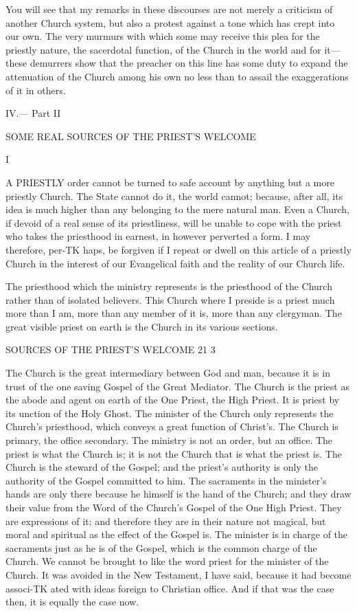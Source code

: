 \documentclass[12pt,a5paper,oneside]{book}
\begin{document}
{{You will see that my remarks in these discourses 
are not merely a criticism of another Church system, 
but also a protest against a tone which has crept into 
our own. The very murmurs with which some may 
receive this plea for the priestly nature, the sacerdotal 
function, of the Church in the world and for it---these 
demurrers show that the preacher on this line has 
some duty to expand the attenuation of the Church 
among his own no less than to assail the exaggerations 
of it in others. 



IV.— Part II 

SOME REAL SOURCES OF THE PRIEST'S 
WELCOME 

I 

A PRIESTLY order cannot be turned to safe account 
by anything but a more priestly Church. The State 
cannot do it, the world cannot; because, after all, 
its idea is much higher than any belonging to the 
mere natural man. Even a Church, if devoid of a 
real sense of its priestliness, will be unable to cope 
with the priest who takes the priesthood in earnest, 
in however perverted a form. I may therefore, per-TK
haps, be forgiven if I repeat or dwell on this article 
of a priestly Church in the interest of our Evangelical 
faith and the reality of our Church life. 

The priesthood which the ministry represents is 
the priesthood of the Church rather than of isolated 
believers. This Church where I preside is a priest 
much more than I am, more than any member of 
it is, more than any clergyman. The great visible 
priest on earth is the Church in its various sections. 



SOURCES OF THE PRIEST'S WELCOME 21 3 

The Church is the great intermediary between God 
and man, because it is in trust of the one saving 
Gospel of the Great Mediator. The Church is the 
priest as the abode and agent on earth of the One 
Priest, the High Priest. It is priest by its unction 
of the Holy Ghost. The minister of the Church 
only represents the Church's priesthood, which conveys 
a great function of Christ's. The Church is primary, 
the office secondary. The ministry is not an order, 
but an office. The priest is what the Church is; 
it is not the Church that is what the priest is. 
The Church is the steward of the Gospel; and the 
priest's authority is only the authority of the Gospel 
committed to him. The sacraments in the minister's 
hands are only there because he himself is the hand 
of the Church; and they draw their value from the 
Word of the Church's Gospel of the One High 
Priest. They are expressions of it; and therefore 
they are in their nature not magical, but moral and 
spiritual as the effect of the Gospel is. The minister 
is in charge of the sacraments just as he is of the 
Gospel, which is the common charge of the Church. 
We cannot be brought to like the word priest for the 
minister of the Church. It was avoided in the New 
Testament, I have said, because it had become associ-TK
ated with ideas foreign to Christian office. And if 
that was the case then, it is equally the case now. 



}}
\end{document}
